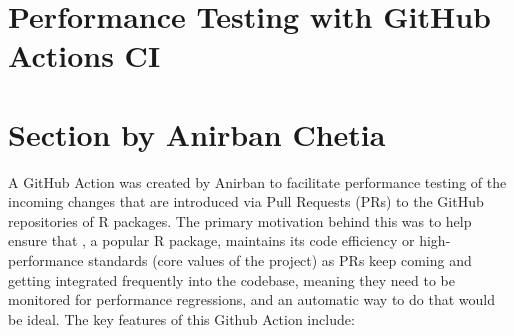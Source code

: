 \section{Performance Testing with GitHub Actions CI}
\section{Section by Anirban Chetia}

A GitHub Action was created by Anirban to facilitate performance testing of the incoming changes that are introduced via Pull Requests (PRs) to the GitHub repositories of R packages. The primary motivation behind this was to help ensure that , a popular R package, maintains its code efficiency or high-performance standards (core values of the project) as PRs keep coming and getting integrated frequently into the codebase, meaning they need to be monitored for performance regressions, and an automatic way to do that would be ideal.
\newline
\newline
The key features of this Github Action include:
